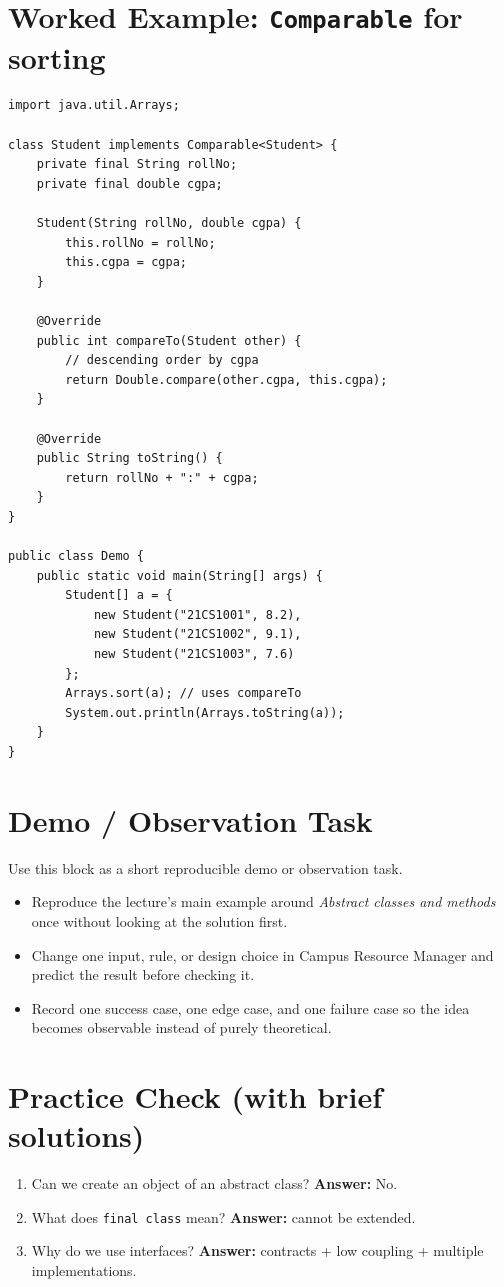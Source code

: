 \documentclass[11pt]{article}
\begin{document}
\section{Worked Example: \texttt{Comparable} for sorting}
\begin{lstlisting}
import java.util.Arrays;

class Student implements Comparable<Student> {
    private final String rollNo;
    private final double cgpa;

    Student(String rollNo, double cgpa) {
        this.rollNo = rollNo;
        this.cgpa = cgpa;
    }

    @Override
    public int compareTo(Student other) {
        // descending order by cgpa
        return Double.compare(other.cgpa, this.cgpa);
    }

    @Override
    public String toString() {
        return rollNo + ":" + cgpa;
    }
}

public class Demo {
    public static void main(String[] args) {
        Student[] a = {
            new Student("21CS1001", 8.2),
            new Student("21CS1002", 9.1),
            new Student("21CS1003", 7.6)
        };
        Arrays.sort(a); // uses compareTo
        System.out.println(Arrays.toString(a));
    }
}
\end{lstlisting}

\section{Demo / Observation Task}
Use this block as a short reproducible demo or observation task.
\begin{itemize}
  \item Reproduce the lecture's main example around \textit{Abstract classes and methods} once without looking at the solution first.
  \item Change one input, rule, or design choice in Campus Resource Manager and predict the result before checking it.
  \item Record one success case, one edge case, and one failure case so the idea becomes observable instead of purely theoretical.
\end{itemize}
\notesources{\OOPSUnitIISources}

\section{Practice Check (with brief solutions)}
\begin{enumerate}
  \item Can we create an object of an abstract class?\; \textbf{Answer:} No.
  \item What does \texttt{final class} mean?\; \textbf{Answer:} cannot be extended.
  \item Why do we use interfaces?\; \textbf{Answer:} contracts + low coupling + multiple implementations.
\end{enumerate}
\end{document}
